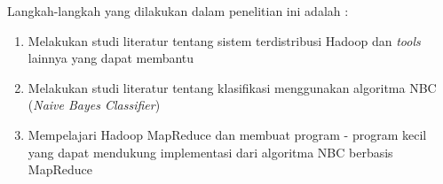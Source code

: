 Langkah-langkah yang dilakukan dalam penelitian ini adalah :
\begin{enumerate}
	\item Melakukan studi literatur tentang sistem terdistribusi Hadoop dan \textit{tools} lainnya yang dapat membantu
		\item Melakukan studi literatur tentang klasifikasi menggunakan algoritma NBC (\textit{Naive Bayes Classifier})
		\item Mempelajari Hadoop MapReduce dan membuat program - program kecil yang dapat mendukung implementasi dari algoritma NBC berbasis MapReduce

\end{enumerate}
